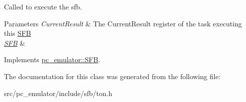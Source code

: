 Called to execute the sfb. 


\begin{DoxyParams}{Parameters}
{\em Current\+Result} & The Current\+Result register of the task executing this \hyperlink{classpc__emulator_1_1SFB}{S\+FB} \\
\hline
{\em \hyperlink{classpc__emulator_1_1SFB}{S\+FB}} & \\
\hline
\end{DoxyParams}


Implements \hyperlink{classpc__emulator_1_1SFB_a203227dee0fcab88b8e9d1055c29d958}{pc\+\_\+emulator\+::\+S\+FB}.



The documentation for this class was generated from the following file\+:\begin{DoxyCompactItemize}
\item 
src/pc\+\_\+emulator/include/sfb/ton.\+h\end{DoxyCompactItemize}
